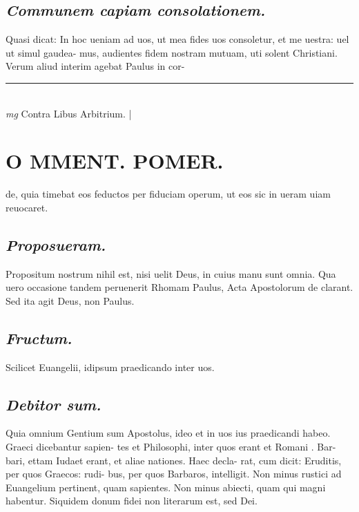 \documentclass{article}
\begin{document}
\begin{pages}
\subsection*{\textit{Communem capiam consolationem. }}\pstart Quasi dicat: In hoc ueniam ad uos, ut mea fides uos consoletur, et me uestra: uel ut simul gaudea- mus, audientes fidem nostram mutuam, uti solent Christiani. Verum aliud interim agebat Paulus in cor-  \pend
\vspace{0.5cm}\noindent
\vspace{0.2cm}\rule{1cm}{0.2pt}\\ 
\hspace{0.2cm}\textit{mg}
\footnotesize Contra Libus  Arbitrium. 
\normalsize| 
\section*{O MMENT. POMER.  }
\marginpar{[ p.tur. ]}\pstart de, quia timebat eos feductos per fiduciam operum, ut eos sic in ueram uiam reuocaret.   \pend
{}
{}
\subsection*{\textit{Proposueram. }}\pstart Propositum nostrum nihil est, nisi uelit Deus, in cuius manu sunt omnia. Qua uero occasione tandem peruenerit Rhomam Paulus, Acta Apostolorum de clarant. Sed ita agit Deus, non Paulus.   \pend
{}
{}
\subsection*{\textit{Fructum. }}\pstart Scilicet Euangelii, idipsum praedicando inter uos.  \pend
{}
{}
\subsection*{\textit{Debitor sum. }}\pstart Quia omnium Gentium sum Apostolus, ideo et in uos ius praedicandi habeo. Graeci dicebantur sapien- tes et Philosophi, inter quos erant et Romani . Bar- bari, ettam Iudaet erant, et aliae nationes. Haec decla- rat, cum dicit: Eruditis, per quos Graecos: rudi- bus, per quos Barbaros, intelligit. Non minus rustici ad Euangelium pertinent, quam sapientes. Non minus abiecti, quam qui magni habentur. Siquidem donum fidei non literarum est, sed Dei.   \pend
{}
{}

\end{pages}
\end{document}
